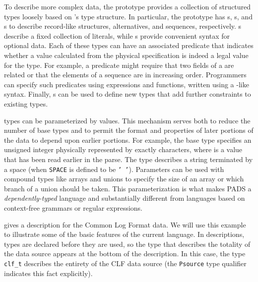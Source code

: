 \documentclass{sigplanconf}
\begin{document}
To describe more complex data, the prototype provides a collection of
structured types loosely based on \C{}'s type structure.  In
particular, the prototype has s, s, and s
to describe record-like structures, alternatives, and sequences,
respectively.  s describe a fixed collection of literals,
while s provide convenient syntax for optional data.  Each of
these types can have an associated predicate that indicates whether a
value calculated from the physical specification is indeed a legal
value for the type.  For example, a predicate might require that two
fields of a  are related or that the elements of a
sequence are in increasing order.  Programmers can specify such
predicates using \pads{} expressions and functions, written using a
\C{}-like syntax.  Finally, \pads{} s can be used to
define new types that add further constraints to existing types.

\pads{} types can be parameterized by values.  This mechanism serves
both to reduce the number of base types and to permit the format and
properties of later portions of the data to depend upon earlier
portions.  For example, the base type  specifies
an unsigned integer physically represented by exactly 
characters, where  is a value that has been read earlier in the
parse.  The type  describes a string
terminated by a space (when \texttt{SPACE} is defined to be \texttt{' '}).  
Parameters can be used with compound types like arrays and unions to
specify the size of an array or which branch of a union should be
taken.  This parameterization is what makes PADS a {\em dependently-typed}
language and substantially different from languages based on
context-free grammars or regular expressions.

 gives a \pads{} description for the Common Log Format
data.  
We will use this example to illustrate some of the basic
features of the current \pads{} language.  
In \pads{} descriptions, types are declared before they are used, 
so the type that describes the totality of the data source appears 
at the bottom of the description.  
In this case,
the type \texttt{clf\_t}  describes the entirety of the
CLF data source (the \texttt{Psource} type qualifier indicates
this fact explicitly).  
\end{document}

